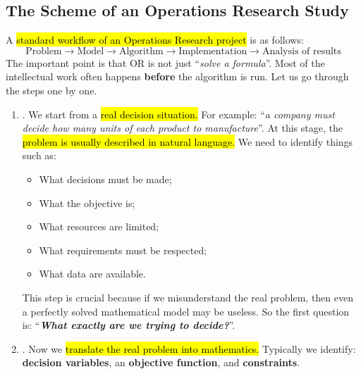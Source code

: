 \subsection{The Scheme of an Operations Research Study}\label{sec:introduction:the-scheme-of-an-operations-research-study}

A \hl{standard workflow of an Operations Research project} is as follows:
\begin{equation*}
    \text{Problem} \to \text{Model} \to \text{Algorithm} \to \text{Implementation} \to \text{Analysis of results}
\end{equation*}
The important point is that OR is not just ``\emph{solve a formula}''. Most of the intellectual work often happens \textbf{before} the algorithm is run. Let us go through the steps one by one.
\begin{enumerate}
    \item {}. We start from a \hl{real decision situation.} For example: ``\emph{a company must decide how many units of each product to manufacture}''. At this stage, the \hl{problem is usually described in natural language.} We need to identify things such as:
        \begin{itemize}
            \item What decisions must be made;
            \item What the objective is;
            \item What resources are limited;
            \item What requirements must be respected;
            \item What data are available.
        \end{itemize}
        This step is crucial because if we misunderstand the real problem, then even a perfectly solved mathematical model may be useless. So the first question is: ``\emph{\textbf{What exactly are we trying to decide?}}''.

    \item {}. Now we \hl{translate the real problem into mathematics.} Typically we identify: \textbf{decision variables}, an \textbf{objective function}, and \textbf{constraints}.


\end{enumerate}
